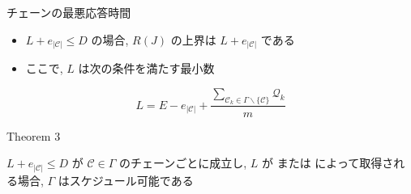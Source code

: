 \begin{frame}[label=theorem2]{チェーンの最悪応答時間}
    \begin{theorem}[]
        \begin{itemize}
            \item $L+e_{|\mathcal{C}|} \leq D$ の場合, $R(J)$ の上界は $L+e_{|\mathcal{C}|}$ である
            \item ここで, $L$ は次の条件を満たす最小数
        \end{itemize}
        \vspace{3mm}
        \begin{equation*}
            L=E-e_{|\mathcal{C}|}+\frac{\sum_{\mathcal{C}_{k} \in \Gamma \backslash\{\mathcal{C}\}} \mathcal{Q}_{k}}{m}
        \end{equation*}
    \end{theorem}
\end{frame}

\begin{frame}[label=theorem3]{Theorem 3}
    \begin{theorem}[]
        $L+e_{|\mathcal{C}|} \leq D$ が $\mathcal{C} \in \Gamma$ のチェーンごとに成立し, $L$ が  または  によって取得される場合, $\Gamma$ はスケジュール可能である
    \end{theorem}
\end{frame}
